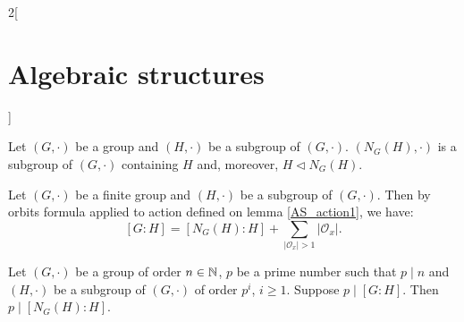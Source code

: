\documentclass[../../../main.tex]{subfiles}
\begin{document}
\begin{multicols}{2}[\section{Algebraic structures}]
\begin{definition}
\end{definition}
\begin{lemma}
    Let $(G,\cdot)$ be a group and $(H,\cdot)$ be a subgroup of $(G,\cdot)$. $(N_G(H),\cdot)$ is a subgroup of $(G,\cdot)$ containing $H$ and, moreover, $H\lhd N_G(H)$.
\end{lemma}
\begin{corollary}
    Let $(G,\cdot)$ be a finite group and $(H,\cdot)$ be a subgroup of $(G,\cdot)$. Then by orbits formula applied to action defined on lemma \ref{AS_action1}, we have: $$[G:H]=[N_G(H):H]+\sum_{|\mathcal{O}_x|>1}|\mathcal{O}_x|.$$
\end{corollary}
\begin{prop}
    Let $(G,\cdot)$ be a group of order $n\in\mathbb{N} $, $p$ be a prime number such that $p\mid n$ and $(H,\cdot)$ be a subgroup of $(G,\cdot)$ of order $p^i$, $i\geq 1$. Suppose $p\mid[G:H]$. Then $p\mid[N_G(H):H]$.
\end{prop}

\end{multicols}
\end{document}

